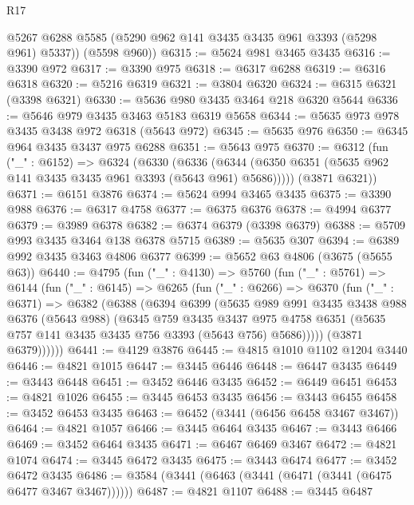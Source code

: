 \begin{lexlean}{R17}
\begin{coremodule}
        @5267
        @6288
        @5585
        (@5290 @962 @141 @3435 @3435 @961 @3393 (@5298 @961) @5337))
      (@5598 @960))
@6315 := @5624 @981 @3465 @3435
@6316 := @3390 @972
@6317 := @3390 @975
@6318 := @6317 @6288
@6319 := @6316 @6318
@6320 := @5216 @6319
@6321 := @3804 @6320
@6324 := @6315 @6321 (@3398 @6321)
@6330 := @5636 @980 @3435 @3464 @218 @6320 @5644
@6336 := @5646 @979 @3435 @3463 @5183 @6319 @5658
@6344 := @5635 @973 @978 @3435 @3438 @972 @6318 (@5643 @972)
@6345 := @5635 @976
@6350 := @6345 @964 @3435 @3437 @975 @6288
@6351 := @5643 @975
@6370 := @6312
    (fun ("_" : @6152) =>
    @6324
      (@6330
        (@6336 (@6344 (@6350 @6351 (@5635 @962 @141 @3435 @3435 @961 @3393 (@5643 @961) @5686)))))
      (@3871 @6321))
@6371 := @6151 @3876
@6374 := @5624 @994 @3465 @3435
@6375 := @3390 @988
@6376 := @6317 @4758
@6377 := @6375 @6376
@6378 := @4994 @6377
@6379 := @3989 @6378
@6382 := @6374 @6379 (@3398 @6379)
@6388 := @5709 @993 @3435 @3464 @138 @6378 @5715
@6389 := @5635 @307
@6394 := @6389 @992 @3435 @3463 @4806 @6377
@6399 := @5652 @63 @4806 (@3675 (@5655 @63))
@6440 := @4795
    (fun ("_" : @4130) =>
    @5760
      (fun ("_" : @5761) =>
      @6144
        (fun ("_" : @6145) =>
        @6265
          (fun ("_" : @6266) =>
          @6370
            (fun ("_" : @6371) =>
            @6382
              (@6388
                (@6394
                  @6399
                  (@5635
                    @989
                    @991
                    @3435
                    @3438
                    @988
                    @6376
                    (@5643 @988)
                    (@6345
                      @759
                      @3435
                      @3437
                      @975
                      @4758
                      @6351
                      (@5635 @757 @141 @3435 @3435 @756 @3393 (@5643 @756) @5686)))))
              (@3871 @6379))))))
@6441 := @4129 @3876
@6445 := @4815 @1010 @1102 @1204 @3440
@6446 := @4821 @1015
@6447 := @3445 @6446
@6448 := @6447 @3435
@6449 := @3443 @6448
@6451 := @3452 @6446 @3435
@6452 := @6449 @6451
@6453 := @4821 @1026
@6455 := @3445 @6453 @3435
@6456 := @3443 @6455
@6458 := @3452 @6453 @3435
@6463 := @6452 (@3441 (@6456 @6458 @3467 @3467))
@6464 := @4821 @1057
@6466 := @3445 @6464 @3435
@6467 := @3443 @6466
@6469 := @3452 @6464 @3435
@6471 := @6467 @6469 @3467
@6472 := @4821 @1074
@6474 := @3445 @6472 @3435
@6475 := @3443 @6474
@6477 := @3452 @6472 @3435
@6486 := @3584 (@3441 (@6463 (@3441 (@6471 (@3441 (@6475 @6477 @3467 @3467))))))
@6487 := @4821 @1107
@6488 := @3445 @6487

\end{coremodule}
\end{lexlean}
